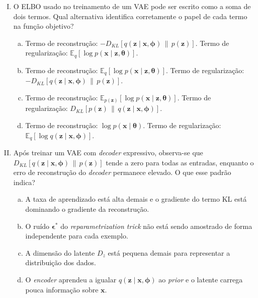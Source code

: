 \documentclass{dlproblemset}
\newcommand{\thetav}{\boldsymbol{\theta}}
\begin{document}
\begin{enumerate}[I)]
    \item O ELBO usado no treinamento de um VAE pode ser escrito como a soma de dois termos. Qual alternativa identifica corretamente o papel de cada termo na função objetivo?
    \begin{enumerate}[(a)]
        \item Termo de reconstrução: $-D_{KL}\!\left[q(\mathbf{z}\mid \mathbf{x},\boldsymbol{\phi})\,\|\,p(\mathbf{z})\right]$. Termo de regularização: $\mathbb{E}_{q}[\log p(\mathbf{x} \mid \mathbf{z}, \thetav)]$.
        \item Termo de reconstrução: $\mathbb{E}_{q}[\log p(\mathbf{x} \mid \mathbf{z}, \thetav)]$. Termo de regularização: $-D_{KL}\!\left[q(\mathbf{z}\mid \mathbf{x},\boldsymbol{\phi})\,\|\,p(\mathbf{z})\right]$.
        \item Termo de reconstrução: $\mathbb{E}_{p(\mathbf{z})}[\log p(\mathbf{x} \mid \mathbf{z}, \thetav)]$. Termo de regularização: $D_{KL}[p(\mathbf{z})\,\|\,q(\mathbf{z}\mid \mathbf{x},\boldsymbol{\phi})]$.
        \item Termo de reconstrução: $\log p(\mathbf{x} \mid \thetav)$. Termo de regularização: $\mathbb{E}_{q}[\log q(\mathbf{z} \mid \mathbf{x}, \boldsymbol{\phi})]$.
    \end{enumerate}

    \item Após treinar um VAE com \textit{decoder} expressivo, observa-se que $D_{KL}\!\left[q(\mathbf{z} \mid \mathbf{x}, \boldsymbol{\phi})\,\|\,p(\mathbf{z})\right]$ tende a zero para todas as entradas, enquanto o erro de reconstrução do \textit{decoder} permanece elevado. O que esse padrão indica?
    \begin{enumerate}[(a)]
        \item A taxa de aprendizado está alta demais e o gradiente do termo KL está dominando o gradiente da reconstrução.
        \item O ruído $\boldsymbol{\epsilon}^{*}$ do \textit{reparametrization trick} não está sendo amostrado de forma independente para cada exemplo.
        \item A dimensão do latente $D_z$ está pequena demais para representar a distribuição dos dados.
        \item O \textit{encoder} aprendeu a igualar $q(\mathbf{z} \mid \mathbf{x}, \boldsymbol{\phi})$ ao \textit{prior} e o latente carrega pouca informação sobre $\mathbf{x}$.
    \end{enumerate}


\end{enumerate}
\end{document}

